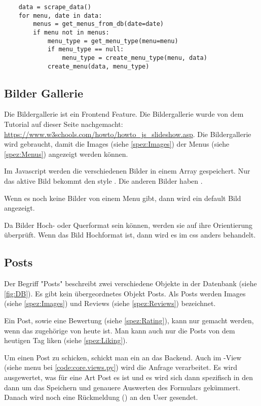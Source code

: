 \begin{lstlisting}
    data = scrape_data()
    for menu, date in data:
        menus = get_menus_from_db(date=date)
        if menu not in menus:
            menu_type = get_menu_type(menu=menu)
            if menu_type == null:
                menu_type = create_menu_type(menu, data)
            create_menu(data, menu_type)
\end{lstlisting}

\subsection{Bilder Gallerie} \label{spez:Gallerie}

Die Bildergallerie ist ein Frontend Feature. Die Bildergallerie wurde von dem
Tutorial auf dieser Seite nachgemacht:
\url{https://www.w3schools.com/howto/howto_js_slideshow.asp}. Die Bildergallerie
wird gebraucht, damit die Images (siehe \ref{spez:Images}) der Menus (siehe
\ref{spez:Menus}) angezeigt werden können.

Im Javascript werden die verschiedenen Bilder in einem Array gespeichert. Nur
das aktive Bild bekommt den style . Die anderen Bilder
haben .

Wenn es noch keine Bilder von einem Menu gibt, dann wird ein default Bild
angezeigt.

Da Bilder Hoch- oder Querformat sein können, werden sie auf ihre Orientierung
überprüft. Wenn das Bild Hochformat ist, dann wird es im css anders
behandelt.

\subsection{Posts} \label{spez:Posts}

Der Begriff "Posts" beschreibt zwei verschiedene Objekte in der Datenbank (siehe
\ref{fig:DB}). Es gibt kein übergeordnetes Objekt Posts. Als Posts werden Images
(siehe \ref{spez:Images}) und Reviews (siehe \ref{spez:Reviews}) bezeichnet.

Ein Post, sowie eine Bewertung (siehe \ref{spez:Rating}), kann nur gemacht
werden, wenn das zugehörige  von heute ist. Man kann auch nur die
Posts von dem heutigen Tag liken (siehe \ref{spez:Liking}).

Um einen Post zu schicken, schickt man ein  an das Backend.
Auch im -View (siehe menu bei {\ref{code:core.views.py}}) wird die
Anfrage verarbeitet. Es wird ausgewertet, was für eine Art Post es ist und es
wird sich dann spezifisch in den  dann um das Speichern
und genauere Auswerten des Formulars gekümmert. Danach wird noch eine
Rückmeldung () an den User gesendet.

